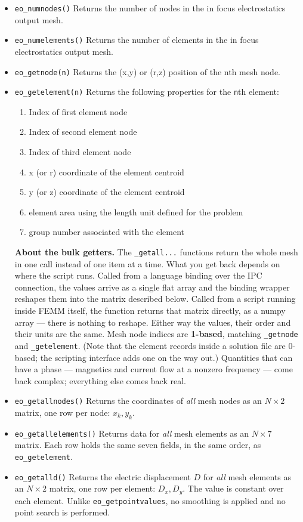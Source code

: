 \begin{itemize}
\item{\tt eo\_numnodes()} Returns the number of nodes in the in focus electrostatics output mesh.
\item{\tt eo\_numelements()} Returns the number of elements in the in focus electrostatics output mesh.
\item{\tt eo\_getnode(n)} Returns the (x,y) or (r,z) position of the nth mesh node.
\item{\tt eo\_getelement(n)} Returns the following properties for the {\tt n}th element:
    \begin{enumerate}
        \item Index of first element node
        \item Index of second element node
        \item Index of third element node
        \item x (or r) coordinate of the element centroid
        \item y (or z) coordinate of the element centroid
        \item element area using the length unit defined for the problem
        \item group number associated with the element
    \end{enumerate}
\medskip\noindent
{\bf About the bulk getters.}  The {\tt *\_getall...} functions return the whole
mesh in one call instead of one item at a time.  What you get back depends on
where the script runs.  Called from a language binding over the IPC connection,
the values arrive as a single flat array and the binding wrapper reshapes them
into the matrix described below.  Called from a script running inside FEMM
itself, the function returns that matrix directly, as a numpy array --- there is
nothing to reshape.  Either way the values, their order and their units are the
same.  Mesh node indices are {\bf 1-based}, matching {\tt *\_getnode} and
{\tt *\_getelement}.  (Note that the element records inside a solution file are
0-based; the scripting interface adds one on the way out.)  Quantities that can
have a phase --- magnetics and current flow at a nonzero frequency --- come back
complex; everything else comes back real.
\medskip

\item{\tt eo\_getallnodes()} Returns the coordinates of {\em all} mesh nodes as
an $N \times 2$ matrix, one row per node: $x_k, y_k$.

\item{\tt eo\_getallelements()} Returns data for {\em all} mesh elements as an
$N \times 7$ matrix.  Each row holds the same seven fields, in the same order,
as {\tt eo\_getelement}.
\item{\tt eo\_getalld()} Returns the electric displacement $D$ for {\em all} mesh
elements as an $N \times 2$ matrix, one row per element: $D_x, D_y$.  The value
is constant over each element.  Unlike {\tt eo\_getpointvalues}, no smoothing is
applied and no point search is performed.


\end{itemize}
